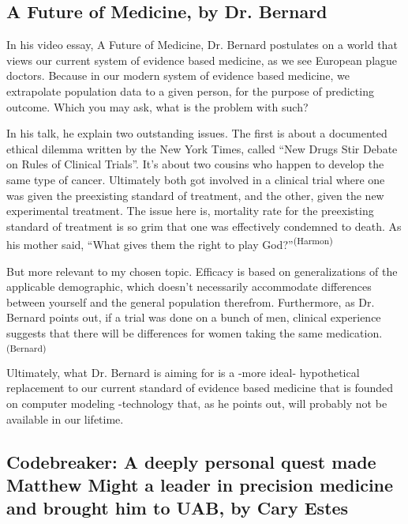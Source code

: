 \subsection{A Future of Medicine, by Dr. Bernard}


In his video essay, A Future of Medicine, Dr. Bernard postulates on a world that views our current system of evidence based medicine, as we see European plague doctors. Because in our modern system of evidence based medicine, we extrapolate population data to a given person, for the purpose of predicting outcome. Which you may ask, what is the problem with such? 

In his talk, he explain two outstanding issues. The first is about a documented ethical dilemma written by the New York Times, called ``New Drugs Stir Debate on Rules of Clinical Trials''. It's about two cousins who happen to develop the same type of cancer. Ultimately both got involved in a clinical trial where one was given the preexisting standard of treatment, and the other, given the new experimental treatment. The issue here is, mortality rate for the preexisting standard of treatment is so grim that one was effectively condemned to death. As his mother said, ``What gives them the right to play God?''\textsuperscript{(Harmon)}

But more relevant to my chosen topic. Efficacy is based on generalizations of the applicable demographic, which doesn’t necessarily accommodate differences between yourself and the general population therefrom. Furthermore, as Dr. Bernard points out, if a trial was done on a bunch of men, clinical experience suggests that there will be differences for women taking the same medication.\textsuperscript{(Bernard)}

Ultimately, what Dr. Bernard is aiming for is a -more ideal- hypothetical replacement to our current standard of evidence based medicine that is founded on computer modeling -technology that, as he points out, will probably not be available in our lifetime.


\subsection{Codebreaker: A deeply personal quest made Matthew Might a leader in precision medicine and brought him to UAB, by Cary Estes}


